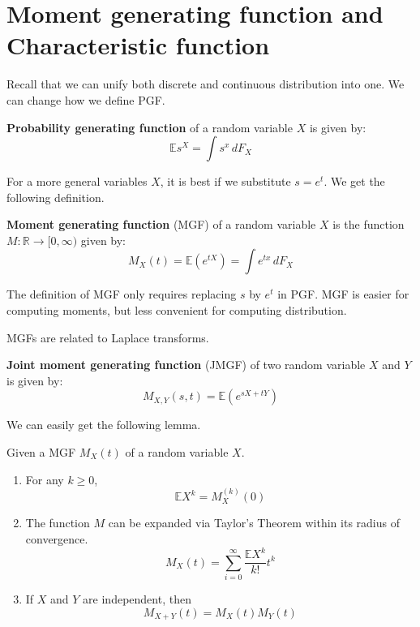 \documentclass{huhtakm-template-book}
\newcommand{\expect}{\mathbb{E}}
\begin{document}
\section{Moment generating function and Characteristic function}
Recall that we can unify both discrete and continuous distribution into one. We can change how we define PGF.
\begin{defn}
	\textbf{Probability generating function} of a random variable $X$ is given by:
	\begin{equation*}
		\expect s^{X}=\int s^{x}\,dF_{X}
	\end{equation*}
\end{defn}
For a more general variables $X$, it is best if we substitute $s=e^{t}$. We get the following definition.
\begin{defn}
	\textbf{Moment generating function} (MGF) of a random variable $X$ is the function $M:\mathbb{R}\to[0,\infty)$ given by:
	\begin{equation*}
		M_{X}(t)=\expect(e^{tX})=\int e^{tx}\,dF_{X}
	\end{equation*}
\end{defn}
\begin{rem}
	The definition of MGF only requires replacing $s$ by $e^{t}$ in PGF. MGF is easier for computing moments, but less convenient for computing distribution.
\end{rem}
\begin{rem}
	MGFs are related to Laplace transforms.
\end{rem}
\begin{defn}
	\textbf{Joint moment generating function} (JMGF) of two random variable $X$ and $Y$ is given by:
	\begin{equation*}
		M_{X,Y}(s,t)=\expect(e^{sX+tY})
	\end{equation*}
\end{defn}
We can easily get the following lemma.
\begin{lem}
	Given a MGF $M_{X}(t)$ of a random variable $X$. 
	\begin{enumerate}
		\item For any $k\geq 0$,
		\begin{equation*}
			\expect X^{k}=M_{X}^{(k)}(0)
		\end{equation*}
		\item The function $M$ can be expanded via Taylor's Theorem within its radius of convergence.
		\begin{equation*}
			M_{X}(t)=\sum_{i=0}^{\infty}\frac{\expect X^{k}}{k!}t^{k}
		\end{equation*}
		\item If $X$ and $Y$ are independent, then
		\begin{equation*}
			M_{X+Y}(t)=M_{X}(t)M_{Y}(t)
		\end{equation*}
	\end{enumerate}
\end{lem}
\end{document}
